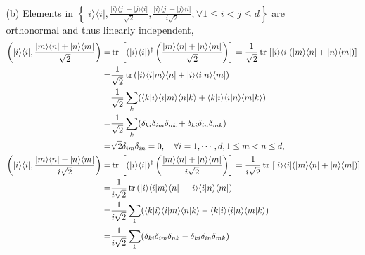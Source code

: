 \documentclass[en]{sol-man}
\begin{document}
\begin{sol}
\begin{itemize}
\begin{itemize}
\begin{align}
            \end{align}
            \item[(b)] Elements in $\left\{\lvert i\rangle\langle i\rvert,\frac{\lvert i\rangle\langle j\rvert+\lvert j\rangle\langle i\rvert}{\sqrt{2}},\frac{\lvert i\rangle\langle j\rvert-\lvert j\rangle\langle i\rvert}{i\sqrt{2}};\forall 1\leq i<j\leq d\right\}$ are orthonormal and thus linearly independent,
            \begin{align}
                \notag\left(\lvert i\rangle\langle i\rvert,\frac{\lvert m\rangle\langle n\rvert+\lvert n\rangle\langle m\rvert}{\sqrt{2}}\right)=&\tr\left[(\lvert i\rangle\langle i\rvert)^{\dagger}\left(\frac{\lvert m\rangle\langle n\rvert+\lvert n\rangle\langle m\rvert}{\sqrt{2}}\right)\right]=\frac{1}{\sqrt{2}}\tr\left[\lvert i\rangle\langle i\rvert(\lvert m\rangle\langle n\rvert+\lvert n\rangle\langle m\rvert)\right]\\
                \notag=&\frac{1}{\sqrt{2}}\tr(\lvert i\rangle\langle i\vert m\rangle\langle n\rvert+\lvert i\rangle\langle i\vert n\rangle\langle m\rvert)\\
                \notag=&\frac{1}{\sqrt{2}}\sum_k(\langle k\vert i\rangle\langle i\vert m\rangle\langle n\vert k\rangle+\langle k\vert i\rangle\langle i\vert n\rangle\langle m\vert k\rangle)\\
                \notag=&\frac{1}{\sqrt{2}}\sum_k(\delta_{ki}\delta_{im}\delta_{nk}+\delta_{ki}\delta_{in}\delta_{mk})\\
                =&\sqrt{2}\delta_{im}\delta_{in}=0,\quad\forall i=1,\cdots,d,1\leq m<n\leq d,\\
                \notag\left(\lvert i\rangle\langle i\rvert,\frac{\lvert m\rangle\langle n\rvert-\lvert n\rangle\langle m\rvert}{i\sqrt{2}}\right)=&\tr\left[(\lvert i\rangle\langle i\rvert)^{\dagger}\left(\frac{\lvert m\rangle\langle n\rvert+\lvert n\rangle\langle m\rvert}{i\sqrt{2}}\right)\right]=\frac{1}{i\sqrt{2}}\tr\left[\lvert i\rangle\langle i\rvert(\lvert m\rangle\langle n\rvert+\lvert n\rangle\langle m\rvert)\right]\\
                \notag=&\frac{1}{i\sqrt{2}}\tr(\lvert i\rangle\langle i\vert m\rangle\langle n\rvert-\lvert i\rangle\langle i\vert n\rangle\langle m\rvert)\\
                \notag=&\frac{1}{i\sqrt{2}}\sum_k(\langle k\vert i\rangle\langle i\vert m\rangle\langle n\vert k\rangle-\langle k\vert i\rangle\langle i\vert n\rangle\langle m\vert k\rangle)\\
                \notag=&\frac{1}{i\sqrt{2}}\sum_k(\delta_{ki}\delta_{im}\delta_{nk}-\delta_{ki}\delta_{in}\delta_{mk})\\

\end{align}
\end{itemize}
\end{itemize}
\end{sol}
\end{document}
